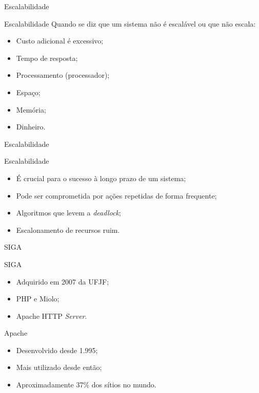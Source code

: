 \begin{frame}{Escalabilidade}
	\begin{block}{Escalabilidade}
		Quando se diz que um sistema não é escalável ou que não escala:
		\begin{itemize}
			\item Custo adicional é excessivo; \pause
			\item Tempo de resposta; \pause
			\item Processamento (processador); \pause
			\item Espaço; \pause
			\item Memória; \pause
			\item Dinheiro.
		\end{itemize}
	\end{block}
\end{frame}
\begin{frame}{Escalabilidade}
	\begin{block}{Escalabilidade}
		\begin{itemize}
			\item É crucial para o sucesso à longo prazo de um sistema; \pause
			\item Pode ser comprometida por ações repetidas de forma frequente; 
			\pause
			\item Algoritmos que levem a \textit{deadlock}; \pause
			\item Escalonamento de recursos ruim.
		\end{itemize}
	\end{block}
\end{frame}
\begin{frame}{SIGA}
	\begin{block}{SIGA}
		\begin{itemize}
			\item Adquirido em 2007 da UFJF; \pause
			\item PHP e Miolo; \pause
			\item Apache HTTP \textit{Server}.
		\end{itemize}
	\end{block} \pause
	\begin{block}{Apache}
		\begin{itemize}
			\item Desenvolvido desde 1.995;
			\item Mais utilizado desde então;
			\item Aproximadamente 37\% dos sítios no mundo.
		\end{itemize}
	\end{block}
\end{frame}
